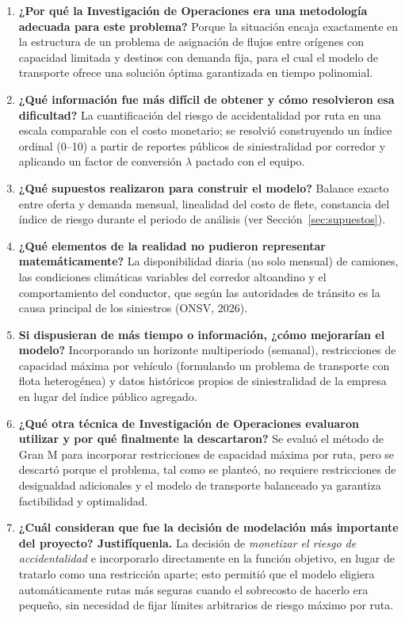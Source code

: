 \documentclass[11pt,a4paper]{article}
\begin{document}
\begin{enumerate}
\item \textbf{¿Por qu\'e la Investigaci\'on de Operaciones era una metodolog\'ia adecuada para este problema?} Porque la situaci\'on encaja exactamente en la estructura de un problema de asignaci\'on de flujos entre or\'igenes con capacidad limitada y destinos con demanda fija, para el cual el modelo de transporte ofrece una soluci\'on \'optima garantizada en tiempo polinomial.
\item \textbf{¿Qu\'e informaci\'on fue m\'as dif\'icil de obtener y c\'omo resolvieron esa dificultad?} La cuantificaci\'on del riesgo de accidentalidad por ruta en una escala comparable con el costo monetario; se resolvi\'o construyendo un \'indice ordinal (0--10) a partir de reportes p\'ublicos de siniestralidad por corredor y aplicando un factor de conversi\'on $\lambda$ pactado con el equipo.
\item \textbf{¿Qu\'e supuestos realizaron para construir el modelo?} Balance exacto entre oferta y demanda mensual, linealidad del costo de flete, constancia del \'indice de riesgo durante el periodo de an\'alisis (ver Secci\'on~\ref{sec:supuestos}).
\item \textbf{¿Qu\'e elementos de la realidad no pudieron representar matem\'aticamente?} La disponibilidad diaria (no solo mensual) de camiones, las condiciones clim\'aticas variables del corredor altoandino y el comportamiento del conductor, que seg\'un las autoridades de tr\'ansito es la causa principal de los siniestros (ONSV, 2026).
\item \textbf{Si dispusieran de m\'as tiempo o informaci\'on, ¿c\'omo mejorar\'ian el modelo?} Incorporando un horizonte multiperiodo (semanal), restricciones de capacidad m\'axima por veh\'iculo (formulando un problema de transporte con flota heterog\'enea) y datos hist\'oricos propios de siniestralidad de la empresa en lugar del \'indice p\'ublico agregado.
\item \textbf{¿Qu\'e otra t\'ecnica de Investigaci\'on de Operaciones evaluaron utilizar y por qu\'e finalmente la descartaron?} Se evalu\'o el m\'etodo de Gran M para incorporar restricciones de capacidad m\'axima por ruta, pero se descart\'o porque el problema, tal como se plante\'o, no requiere restricciones de desigualdad adicionales y el modelo de transporte balanceado ya garantiza factibilidad y optimalidad.
\item \textbf{¿Cu\'al consideran que fue la decisi\'on de modelaci\'on m\'as importante del proyecto? Justif\'iquenla.} La decisi\'on de \emph{monetizar el riesgo de accidentalidad} e incorporarlo directamente en la funci\'on objetivo, en lugar de tratarlo como una restricci\'on aparte; esto permiti\'o que el modelo eligiera autom\'aticamente rutas m\'as seguras cuando el sobrecosto de hacerlo era peque\~no, sin necesidad de fijar l\'imites arbitrarios de riesgo m\'aximo por ruta.
\end{enumerate}
\end{document}
